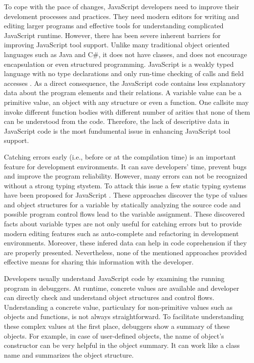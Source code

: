 \documentclass[conference]{IEEEtran}
\begin{document}
To cope with the pace of changes, JavaScript developers need to improve their develoment processes and practices. They need modern editors for writing and editing larger programs and effective tools for understanding complicated JavaScript runtime. However, there has been severe inherent barriers for improving JavaScript tool support. 
Unlike many traditional object oriented languages such as Java and C\#, it does not have classes, and does not encourage encapsulation or even structured programming. JavaScript is a weakly typed language with no type declarations and only run-time checking of calls and field accesses \cite{Richards}. As a direct consequence, the JavaScript code contains less explanatory data about the program elements and their relations. A variable value can be a primitive value, an object with any structure or even a function. One callsite may invoke different function bodies with different number of arities that none of them can be understood from the code. Therefore, the lack of descriptive data in JavaScript code is the most fundumental issue in enhancing JavaScript tool support.

Catching errors early (i.e., before or at the compilation time) is an important feature for development environments. It can save developers' time, prevent bugs and improve the program reliability. However, many errors can not be recognized without a strong typing stystem. To attack this issue a few static typing systems have been proposed for JavaScript \cite{Anderson, Anderson2, Heidegger, Thiemann}. These approaches discover the type of values and object structures for a variable by statically analyzing the source code and possible program control flows lead to the variable assignment. These discovered facts about variable types are not only useful for catching errors but to provide modern editing features such as auto-complete and refactoring in development environments. Moreover, these infered data can help in code coprehension if they are properly presented. Nevertheless, none of the mentioned approaches provided effective means for sharing this information with the developer. 

Developers usually understand JavaScript code by examining the running program in debuggers. At runtime, concrete values are available and developer can directly check and understand object structures and control flows. Understanding a concrete value, particulary for non-primitive values such as objects and functions, is not always straightforward. To facilitate understanding these complex values at the first place, debuggers show a summary of these objects. For example, in case of user-defined objects, the name of object's constructor can be very helpful in the object summary. It can work like a class name and summarizes the object structure.
\end{document}

